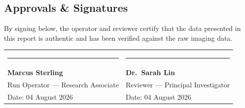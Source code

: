 \vspace{8pt}
\subsection*{Approvals \& Signatures}
By signing below, the operator and reviewer certify that the data presented in this report is authentic and has been verified against the raw imaging data.

\vspace{8pt}
\noindent
\begin{tabularx}{\textwidth}{@{}X X@{}}
  \rule{6cm}{0.6pt} & \rule{6cm}{0.6pt} \\
  \textbf{Marcus Sterling} & \textbf{Dr.~Sarah Lin} \\
  Run Operator --- Research Associate & Reviewer --- Principal Investigator \\
  Date: 04 August 2026 & Date: 04 August 2026 \\
\end{tabularx}
